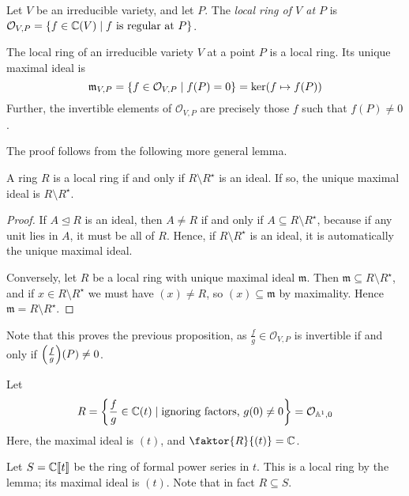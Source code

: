 \begin{definition}
    Let \( V \) be an irreducible variety, and let \( P \).
    The \emph{local ring of \( V \) at \( P \)} is \( \mathcal O_{V,P} = \qty{f \in \mathbb C(V) \mid f \text{ is regular at } P} \).
\end{definition}
\begin{proposition}
    The local ring of an irreducible variety \( V \) at a point \( P \) is a local ring.
    Its unique maximal ideal is
    \[ \mathfrak m_{V,P} = \qty{f \in \mathcal O_{V,P} \mid f(P) = 0} = \ker (f \mapsto f(P)) \]
    Further, the invertible elements of \( \mathcal O_{V,P} \) are precisely those \( f \) such that \( f(P) \neq 0 \).
\end{proposition}
The proof follows from the following more general lemma.
\begin{lemma}
    A ring \( R \) is a local ring if and only if \( R \setminus R^\star \) is an ideal.
    If so, the unique maximal ideal is \( R \setminus R^\star \).
\end{lemma}
\begin{proof}
    If \( A \trianglelefteq R \) is an ideal, then \( A \neq R \) if and only if \( A \subseteq R \setminus R^\star \), because if any unit lies in \( A \), it must be all of \( R \).
    Hence, if \( R \setminus R^\star \) is an ideal, it is automatically the unique maximal ideal.

    Conversely, let \( R \) be a local ring with unique maximal ideal \( \mathfrak m \).
    Then \( \mathfrak m \subseteq R \setminus R^\star \), and if \( x \in R \setminus R^\star \) we must have \( (x) \neq R \), so \( (x) \subseteq \mathfrak m \) by maximality.
    Hence \( \mathfrak m = R \setminus R^\star \).
\end{proof}
Note that this proves the previous proposition, as \( \frac{f}{g} \in \mathcal O_{V,P} \) is invertible if and only if \( \qty(\frac{f}{g})(P) \neq 0 \).
\begin{example}
    Let
    \[ R = \qty{\frac{f}{g} \in \mathbb C(t) \mid \text{ignoring factors, } g(0) \neq 0} = \mathcal O_{\mathbb A^1, 0} \]
    Here, the maximal ideal is \( (t) \), and \( \faktor{R}{(t)} = \mathbb C \).

    Let \( S = \mathbb C[\![t]\!] \) be the ring of formal power series in \( t \).
    This is a local ring by the lemma; its maximal ideal is \( (t) \).
    Note that in fact \( R \subseteq S \).
\end{example}
